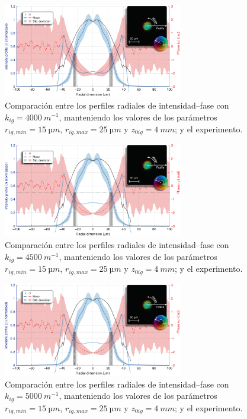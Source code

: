 \begin{figure}[htbp]
  \centering
  \includegraphics[width=0.7\textwidth]{Figuras/anx_cmp_72.png}
  \caption*{Comparación entre los perfiles radiales de intensidad--fase con $k_{ig}=\qty{4000}{m^{-1}}$, manteniendo los valores de los parámetros $r_{ig,min}=\qty{15}{µm}$, $r_{ig,max}=\qty{25}{µm}$ y $z_{0ig}=\qty{4}{mm}$; y el experimento.}
\end{figure}

\begin{figure}[htbp]
  \centering
  \includegraphics[width=0.7\textwidth]{Figuras/anx_cmp_73.png}
  \caption*{Comparación entre los perfiles radiales de intensidad--fase con $k_{ig}=\qty{4500}{m^{-1}}$, manteniendo los valores de los parámetros $r_{ig,min}=\qty{15}{µm}$, $r_{ig,max}=\qty{25}{µm}$ y $z_{0ig}=\qty{4}{mm}$; y el experimento.}
\end{figure}

\begin{figure}[htbp]
  \centering
  \includegraphics[width=0.7\textwidth]{Figuras/anx_cmp_74.png}
  \caption*{Comparación entre los perfiles radiales de intensidad--fase con $k_{ig}=\qty{5000}{m^{-1}}$, manteniendo los valores de los parámetros $r_{ig,min}=\qty{15}{µm}$, $r_{ig,max}=\qty{25}{µm}$ y $z_{0ig}=\qty{4}{mm}$; y el experimento.}
\end{figure}

